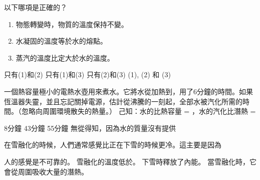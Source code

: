 {
    以下哪項是正確的？
    \begin{enumerate}[label=\sd]
        \item 物態轉變時，物質的溫度保持不變。
        \item 水凝固的溫度等於水的熔點。
        \item 蒸汽的溫度比定大於水的溫度。
    \end{enumerate}
    \begin{choices}
        \CorrectChoice 只有(1)和(2)
        \choice 只有(1)和(3)
        \choice 只有(2)和(3)
        \choice (1), (2) 和 (3)
    \end{choices}
}{}

{
    一個熱容量極小的電熱水壺用來煮水。它將水從加熱到，用了6分鐘的時間。如果恆溫器失靈，並且忘記關掉電源，估計從沸騰的一刻起，全部水被汽化所需的時間。（忽略向周圍環境散失的熱量。）
    己知：水的比熱容量 = ，水的汽化比潛熱 = 
    \begin{choices}
        \choice 8分鐘
        \CorrectChoice 43分鐘
        \choice 55分鐘
        \choice 無從得知，因為水的質量沒有提供
    \end{choices}
}{}

{
    在雪融化的時候，人們通常感覺比正在下雪的時候更冷。這主要是因為

    \begin{choices}
        \choice 人的感覺是不可靠的。
        \choice 雪融化的溫度低於。
        \choice 下雪時釋放了內能。
        \CorrectChoice 當雪融化時，它會從周圍吸收大量的潛熱。
    \end{choices}
}{}

